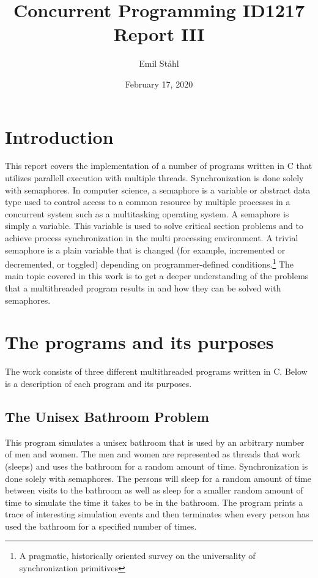 \documentclass{article}
\title{\textbf{Concurrent Programming ID1217} \\ 
\textbf{Report III}}
\author{Emil Ståhl}
\date{February 17, 2020}
\begin{document}
\maketitle

\section{Introduction}

This report covers the implementation of a number of programs written in C that utilizes parallell execution with multiple threads. Synchronization is done solely with semaphores. In computer science, a semaphore is a variable or abstract data type used to control access to a common resource by multiple processes in a concurrent system such as a multitasking operating system. A semaphore is simply a variable. This variable is used to solve critical section problems and to achieve process synchronization in the multi processing environment. A trivial semaphore is a plain variable that is changed (for example, incremented or decremented, or toggled) depending on programmer-defined conditions.\footnote[1]{A pragmatic, historically oriented survey on the universality of synchronization primitives} The main topic covered in this work is to get a deeper understanding of the problems that a multithreaded program results in and how they can be solved with semaphores. 

\section{The programs and its purposes}

The work consists of three different multithreaded programs written in C. Below is a description of each program and its purposes.  

\subsection{The Unisex Bathroom Problem}

This program simulates a unisex bathroom that is used by an arbitrary number of men and women. The men and women are represented as threads that work (sleeps) and uses the bathroom for a random amount of time. Synchronization is done solely with semaphores. The persons will sleep for a random amount of time between visits to the bathroom as well as sleep for a smaller random amount of time to simulate the time it takes to be in the bathroom. The program prints a trace of interesting simulation events and then terminates when every person has used the bathroom for a specified number of times. 
\end{document}

